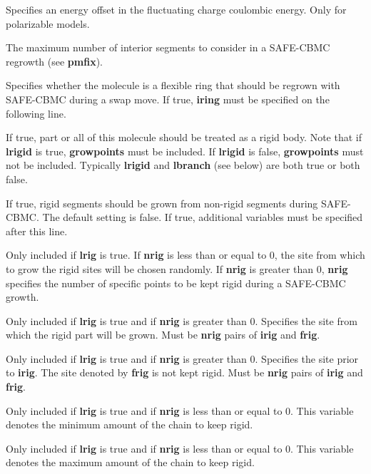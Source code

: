 \documentclass[12pt,letterpaper]{article}
\begin{document}
 Specifies an energy offset in the fluctuating
charge coulombic energy.  Only for polarizable models.

 The maximum number of interior segments to consider
in a SAFE-CBMC regrowth (see {\textbf {pmfix}}).

 Specifies whether the molecule is a flexible ring
that should be regrown with SAFE-CBMC during a swap move.  If true,
{\textbf {iring}} must be specified on the following line.

 If true, part or all of this molecule should be treated as a rigid body.
Note that if {\textbf{lrigid}} is true, {\textbf{growpoints}} must be included.  
If {\textbf{lrigid}} is false, {\textbf{growpoints}} must not be included.
Typically {\textbf{lrigid}} and {\textbf{lbranch}} (see below) are both true or both false.

 If true, rigid segments should be grown from non-rigid segments 
during SAFE-CBMC.  The default setting is false.
If true, additional variables must be specified after this line.

 Only included if {\textbf{lrig}} is true.
If {\textbf{nrig}} is less than or equal to 0, the site from which to grow the rigid sites will be chosen randomly.
If {\textbf{nrig}} is greater than 0, {\textbf{nrig}} specifies the number of specific points to be kept rigid during
a SAFE-CBMC growth.

 Only included if {\textbf{lrig}} is true and 
if {\textbf{nrig}} is greater than 0.
Specifies the site from which the rigid part will be grown.
Must be {\textbf{nrig}} pairs of {\textbf{irig}} and {\textbf{frig}}.

 Only included if {\textbf{lrig}} is true and 
if {\textbf{nrig}} is greater than 0.
Specifies the site prior to {\textbf{irig}}.  The site denoted by 
{\textbf{frig}} is not kept rigid.
Must be {\textbf{nrig}} pairs of {\textbf{irig}} and {\textbf{frig}}.

 Only included if {\textbf{lrig}} is true and 
if {\textbf{nrig}} is less than or equal to 0.
This variable denotes the minimum amount of the chain to keep rigid.

 Only included if {\textbf{lrig}} is true and 
if {\textbf{nrig}} is less than or equal to 0.
This variable denotes the maximum amount of the chain to keep rigid.
\end{document}
